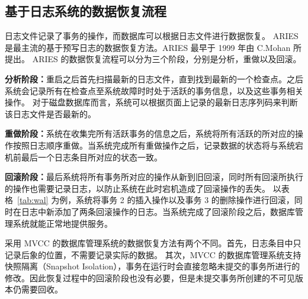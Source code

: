 \subsection{基于日志系统的数据恢复流程}

日志文件记录了事务的操作，而数据库可以根据日志文件进行数据恢复。
ARIES 是最主流的基于预写日志的数据恢复方法。ARIES 最早于 1999 年由 C.Mohan 所提出\cite{mohan_aries_1992}。
ARIES 的数据恢复流程可以分为三个阶段，分别是分析，重做以及回滚。

\textbf{分析阶段：}重启之后首先扫描最新的日志文件，直到找到最新的一个检查点。之后系统会记录所有在检查点至系统故障时时处于活跃的事务信息，以及这些事务相关操作。
对于磁盘数据库而言，系统可以根据页面上记录的最新日志序列码来判断该日志文件是否最新的。

\textbf{重做阶段：}系统在收集完所有活跃事务的信息之后，系统将所有活跃的所对应的操作按照日志顺序重做。当系统完成所有重做操作之后，记录数据的状态将与系统宕机前最后一个日志条目所对应的状态一致。

\textbf{回滚阶段：}最后系统将所有事务所对应的操作从新到旧回滚，同时所有回滚所执行的操作也需要记录日志，以防止系统在此时宕机造成了回滚操作的丢失。
以表格~\ref{tab:wal} 为例，系统将事务 2 的插入操作以及事务 3 的删除操作进行回滚，同时在日志中新添加了两条回滚操作的日志。当系统完成了回滚阶段之后，数据库管理系统就能正常地提供服务。

采用 MVCC 的数据库管理系统的数据恢复方法有两个不同。首先，日志条目中只记录后象的位置，不需要记录实际的数据。
其次，MVCC 的数据库管理系统支持快照隔离（Snapshot Isolation），事务在运行时会直接忽略未提交的事务所进行的修改。因此恢复过程中的回滚阶段也没有必要，但是未提交事务所创建的不可见版本仍需要回收。






